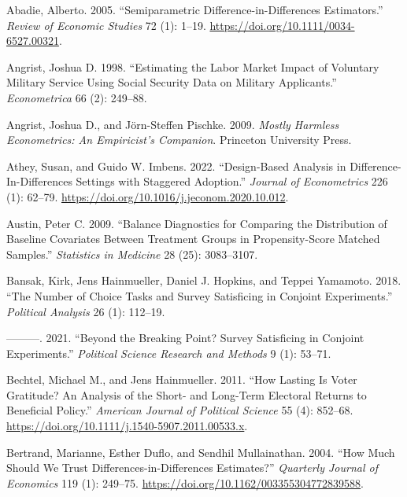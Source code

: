 \documentclass[
]{article}
\newlength{\cslhangindent}
\newenvironment{CSLReferences}[2] %
 {\begin{list}{}{%
  \setlength{\itemindent}{0pt}
  \setlength{\leftmargin}{0pt}
  \setlength{\parsep}{0pt}
  \ifodd #1
   \setlength{\leftmargin}{\cslhangindent}
   \setlength{\itemindent}{-1\cslhangindent}
  \fi
  \setlength{\itemsep}{#2\baselineskip}}}
 {\end{list}}
\begin{document}
\protect{}\label{refs}
\begin{CSLReferences}{1}{0}
Abadie, Alberto. 2005. {``Semiparametric Difference-in-Differences Estimators.''} \emph{Review of Economic Studies} 72 (1): 1--19. \url{https://doi.org/10.1111/0034-6527.00321}.

Angrist, Joshua D. 1998. {``Estimating the Labor Market Impact of Voluntary Military Service Using Social Security Data on Military Applicants.''} \emph{Econometrica} 66 (2): 249--88.

Angrist, Joshua D., and Jörn-Steffen Pischke. 2009. \emph{Mostly Harmless Econometrics: An Empiricist's Companion}. Princeton University Press.

Athey, Susan, and Guido W. Imbens. 2022. {``Design-Based Analysis in {Difference-In-Differences} Settings with Staggered Adoption.''} \emph{Journal of Econometrics} 226 (1): 62--79. \url{https://doi.org/10.1016/j.jeconom.2020.10.012}.

Austin, Peter C. 2009. {``Balance Diagnostics for Comparing the Distribution of Baseline Covariates Between Treatment Groups in Propensity-Score Matched Samples.''} \emph{Statistics in Medicine} 28 (25): 3083--3107.

Bansak, Kirk, Jens Hainmueller, Daniel J. Hopkins, and Teppei Yamamoto. 2018. {``The Number of Choice Tasks and Survey Satisficing in Conjoint Experiments.''} \emph{Political Analysis} 26 (1): 112--19.

---------. 2021. {``Beyond the Breaking Point? Survey Satisficing in Conjoint Experiments.''} \emph{Political Science Research and Methods} 9 (1): 53--71.

Bechtel, Michael M., and Jens Hainmueller. 2011. {``How Lasting Is Voter Gratitude? An Analysis of the Short- and Long-Term Electoral Returns to Beneficial Policy.''} \emph{American Journal of Political Science} 55 (4): 852--68. \url{https://doi.org/10.1111/j.1540-5907.2011.00533.x}.

Bertrand, Marianne, Esther Duflo, and Sendhil Mullainathan. 2004. {``How Much Should We Trust Differences-in-Differences Estimates?''} \emph{Quarterly Journal of Economics} 119 (1): 249--75. \url{https://doi.org/10.1162/003355304772839588}.


\end{CSLReferences}
\end{document}
